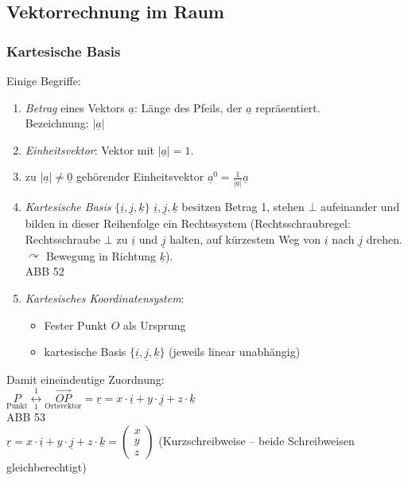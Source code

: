 \subsection{Vektorrechnung im Raum}
\subsubsection{Kartesische Basis}
Einige Begriffe:
\begin{enumerate}
\item \emph{Betrag} eines Vektors $\underline{a}$: Länge des Pfeils, der $\underline{a}$ repräsentiert.\\
Bezeichnung: $|\underline{a}|$
\item \emph{Einheitsvektor}: Vektor mit $|\underline{a}|=1$.
\item zu $|\underline{a}|\not =\underline{0}$ gehörender Einheitsvektor $\boxed{\underline{a}^0=\frac{1}{|\underline{a}|}\underline{a}}$
\item \emph{Kartesische Basis} $\{\underline{i}, \underline{j}, \underline{k}\}$ $\underline{i}, \underline{j}, \underline{k}$ besitzen Betrag 1, stehen $\bot$ aufeinander und bilden in dieser Reihenfolge ein Rechtssystem (Rechtsschraubregel: Rechtsschraube $\bot$ zu $\underline{i}$ und $\underline{j}$ halten, auf kürzestem Weg von $\underline{i}$ nach $\underline{j}$ drehen. $\curvearrowright$ Bewegung in Richtung $\underline{k}$).\\
ABB 52
\item \emph{Kartesisches Koordinatensystem}: 
\begin{itemize}
\item Fester Punkt $O$ als Ursprung
\item kartesische Basis $\{\underline{i}, \underline{j}, \underline{k}\}$ (jeweils linear unabhängig)
\end{itemize}
\end{enumerate}
Damit eineindeutige Zuordnung:\\
$\underset{\text{Punkt}}{P} \overset{1}{\underset{1}{\longleftrightarrow}}\underset{\text{Ortsvektor}}{\overrightarrow{OP}}=\underline{r}=x\cdot \underline{i}+y\cdot \underline{j}+z\cdot \underline{k}$\\
ABB 53\\
$\underline{r}=x\cdot \underline{i}+y\cdot \underline{j}+z\cdot \underline{k}=\begin{pmatrix}
x\\
y\\
z
\end{pmatrix}$ (Kurzschreibweise -- beide Schreibweisen gleichberechtigt)\\
